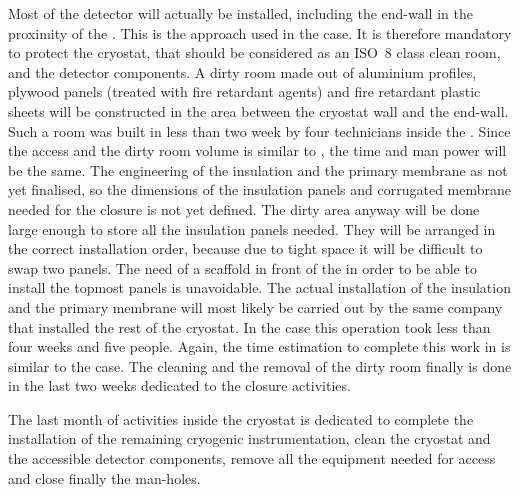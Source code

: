 Most of the detector will actually be installed, including the  end-wall in the proximity of the .
This is the approach used in the  case.
It is therefore mandatory to protect the cryostat, that should be considered as an ISO~8 class clean room, and the detector components.
A dirty room made out of aluminium profiles, plywood panels (treated with fire retardant agents) and fire retardant plastic sheets will be constructed in the area between the cryostat wall and the  end-wall.
Such a room was built in less than two week by four technicians inside the .
Since the access and the dirty room volume is similar to , the time and man power will be the same.
The engineering of the insulation and the primary membrane as not yet finalised, so the dimensions of the insulation panels and corrugated membrane needed for the  closure is not yet defined.
The dirty area anyway will be done large enough to store all the insulation panels needed.
They will be arranged in the correct installation order, because due to tight space it will be difficult to swap two panels.
The need of a scaffold in front of the  in order to be able to install the topmost panels is unavoidable.
The actual installation of the insulation and the primary membrane will most likely be carried out by the same company that installed the rest of the cryostat.
In the  case this operation took less than four weeks and five people.
Again, the time estimation to complete this work in  is similar to the  case.
The cleaning and the removal of the dirty room finally is done in the last two weeks dedicated to the  closure activities.

The last month of activities inside the cryostat is dedicated to complete the installation of the remaining cryogenic instrumentation, clean the cryostat and the accessible detector components, remove all the equipment needed for access and close finally the man-holes.
